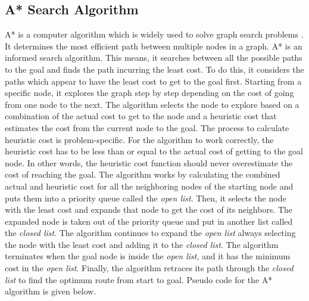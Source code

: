 
\subsection{A* Search Algorithm}
A* is a computer algorithm which is widely used to solve graph search problems \cite{a8book}. It determines the most efficient path between multiple nodes in a graph. A* is an informed search algorithm. This means, it searches between all the possible paths to the goal and finds the path incurring the least cost. To do this, it considers the paths which appear to have the least cost to get to the goal first. Starting from a specific node, it explores the graph step by step depending on the cost of going from one node to the next. The algorithm selects the node to explore based on a combination of the actual cost to get to the node and a heuristic cost that estimates the cost from the current node to the goal. The process to calculate heuristic cost is problem-specific. For the algorithm to work correctly, the heuristic cost has to be less than or equal to the actual cost of getting to the goal node. In other words, the heuristic cost function should never overestimate the cost of reaching the goal. The algorithm works by calculating the combined actual and heuristic cost for all the neighboring nodes of the starting node and puts them into a priority queue called the \textit{open list}. Then, it selects the node with the least cost and expands that node to get the cost of its neighbors. The expanded node is taken out of the priority queue and put in another list called the \textit{closed list}. The algorithm continues to expand the \textit{open list} always selecting the node with the least cost and adding it to the \textit{closed list}. The algorithm terminates when the goal node is inside the \textit{open list}, and it has the minimum cost in the \textit{open list}. Finally, the algorithm retraces its path through the \textit{closed list} to find the optimum route from start to goal. Pseudo code for the A* algorithm is given below.



